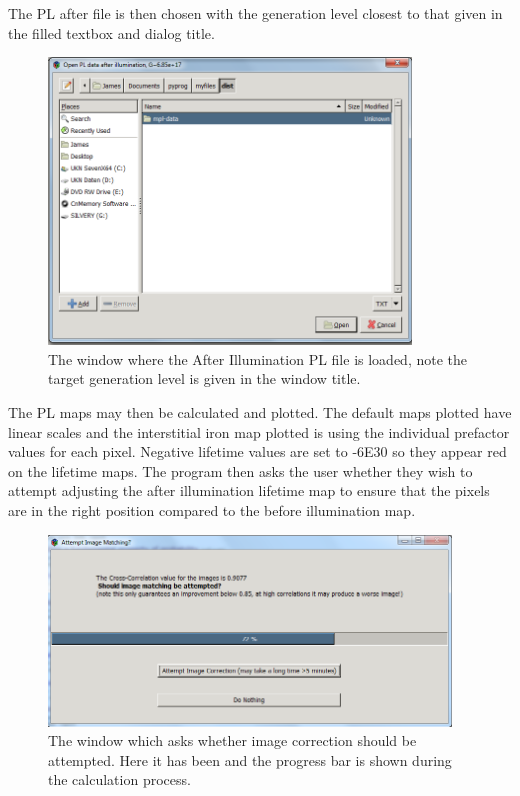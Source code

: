 \documentclass[final,a4paper,oneside,12pt]{article}
\begin{document}
The PL after file is then chosen with the generation level closest to that given in the filled textbox and dialog title.

\begin{figure}[h!]
\includegraphics[height=3in]{2loadplafterfile} 
\caption{\label{figure2} The window where the After Illumination PL file is loaded, note the target generation level is given in the window title.}
\end{figure}


 The PL maps may then be calculated and plotted. The default maps plotted have linear scales and the interstitial iron map plotted is using the individual prefactor values for each pixel. Negative lifetime values are set to -6E30 so they appear red on the lifetime maps. The program then asks the user whether they wish to attempt adjusting the after illumination lifetime map to ensure that the pixels are in the right position compared to the before illumination map.\\

\begin{figure}[h!]
\includegraphics[height=2in]{2attemptcorrection}
\caption{\label{figure2} The window which asks whether image correction should be attempted. Here it has been and the progress bar is shown during the calculation process.}
\end{figure}
\end{document}
